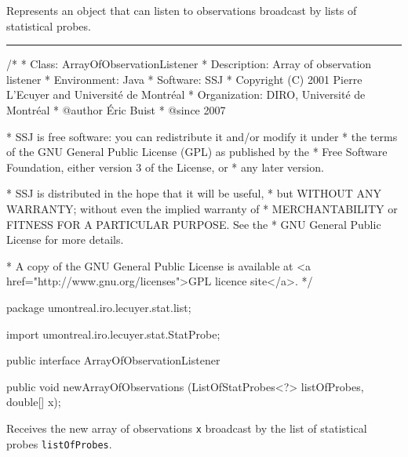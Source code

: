 
Represents an object that can listen to observations broadcast
by lists of statistical probes.

\bigskip\hrule

\begin{code}\begin{hide}
/*
 * Class:        ArrayOfObservationListener
 * Description:  Array of observation listener
 * Environment:  Java
 * Software:     SSJ 
 * Copyright (C) 2001  Pierre L'Ecuyer and Université de Montréal
 * Organization: DIRO, Université de Montréal
 * @author       Éric Buist 
 * @since        2007

 * SSJ is free software: you can redistribute it and/or modify it under
 * the terms of the GNU General Public License (GPL) as published by the
 * Free Software Foundation, either version 3 of the License, or
 * any later version.

 * SSJ is distributed in the hope that it will be useful,
 * but WITHOUT ANY WARRANTY; without even the implied warranty of
 * MERCHANTABILITY or FITNESS FOR A PARTICULAR PURPOSE.  See the
 * GNU General Public License for more details.

 * A copy of the GNU General Public License is available at
   <a href="http://www.gnu.org/licenses">GPL licence site</a>.
 */
\end{hide}
package umontreal.iro.lecuyer.stat.list;
\begin{hide}
import umontreal.iro.lecuyer.stat.StatProbe;
\end{hide}

public interface ArrayOfObservationListener\begin{hide} {\end{hide}

   public void newArrayOfObservations (ListOfStatProbes<?> listOfProbes,
                                       double[] x);
\end{code}
\begin{tabb}  Receives the new array of observations \texttt{x} broadcast by the
   list of statistical probes \texttt{listOfProbes}.
\end{tabb}
\begin{htmlonly}
\end{htmlonly}
\begin{code}\begin{hide}
}\end{hide}
\end{code}
